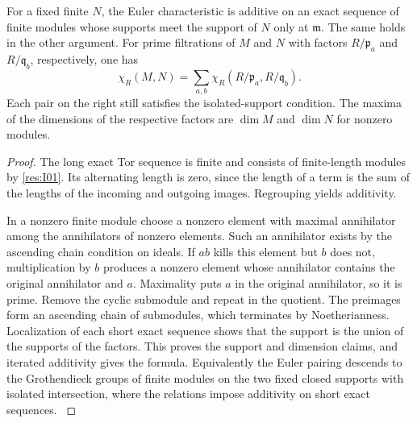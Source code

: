 \begin{proposition}\label{res:I02}
For a fixed finite \(N\), the Euler characteristic is additive on an
exact sequence of finite modules whose supports meet the support of
\(N\) only at \(\mathfrak m\). The same holds in the other argument.
For prime filtrations of \(M\) and \(N\) with factors
\(R/\mathfrak p_a\) and \(R/\mathfrak q_b\), respectively, one has
\[
 \chi_R(M,N)=
 \sum_{a,b}\chi_R(R/\mathfrak p_a,R/\mathfrak q_b).
\]
Each pair on the right still satisfies the isolated-support condition.
The maxima of the dimensions of the respective factors are
\(\dim M\) and \(\dim N\) for nonzero modules.
\end{proposition}
\begin{proof}
The long exact Tor sequence is finite and consists of finite-length
modules by \ref{res:I01}. Its alternating length is zero, since the
length of a term is the sum of the lengths of the incoming and outgoing
images. Regrouping yields additivity.

In a nonzero finite module choose a nonzero element with maximal
annihilator among the annihilators of nonzero elements. Such an
annihilator exists by the ascending chain condition on ideals. If
\(ab\) kills this element but \(b\) does not, multiplication by \(b\)
produces a nonzero element whose annihilator contains the original
annihilator and \(a\). Maximality puts \(a\) in the original
annihilator, so it is prime. Remove the cyclic submodule and repeat
in the quotient. The preimages form an ascending chain of submodules,
which terminates by Noetherianness. Localization of each short exact
sequence shows that the support is the union of the supports of the
factors. This proves the support and dimension claims, and iterated
additivity gives the formula. Equivalently the Euler pairing descends
to the Grothendieck groups of finite modules on the two fixed closed
supports with isolated intersection, where the relations impose
additivity on short exact sequences. \cite[\S2, Lemma 2.2]{dugger}
\end{proof}

